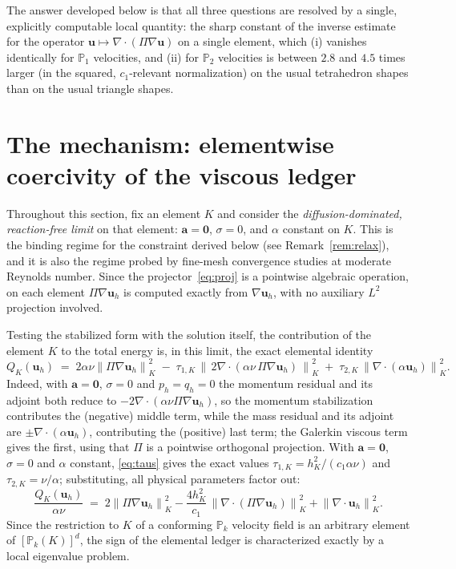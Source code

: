 \documentclass[11pt,a4paper]{article}
\theoremstyle{remark}
\newcommand{\PP}{\mathbb{P}}
\newcommand{\nK}[1]{\left\lVert #1 \right\rVert_{K}}
\newcommand{\Proj}{\Pi}
\begin{document}
The answer developed below is that all three questions are resolved by
a single, explicitly computable local quantity: the sharp constant of
the inverse estimate for the operator
$\boldsymbol u \mapsto \nabla\!\cdot(\Proj\nabla\boldsymbol u)$
on a single element, which (i) vanishes identically for $\PP_1$
velocities, and (ii) for $\PP_2$ velocities is between $2.8$ and $4.5$
times larger (in the squared, $c_1$-relevant normalization) on the
usual tetrahedron shapes than on the usual triangle shapes.

\section{The mechanism: elementwise coercivity of the viscous ledger}
\label{sec:mechanism}

Throughout this section, fix an element $K$ and consider the
\emph{diffusion-dominated, reaction-free limit} on that element:
$\boldsymbol a = \boldsymbol 0$, $\sigma = 0$, and $\alpha$ constant on
$K$. This is the binding regime for the constraint derived below (see
Remark~\ref{rem:relax}), and it is also the regime probed by
fine-mesh convergence studies at moderate Reynolds number. Since the
projector~\eqref{eq:proj} is a pointwise algebraic operation, on each
element $\Proj\nabla\boldsymbol u_h$ is computed exactly from
$\nabla\boldsymbol u_h$, with no auxiliary $L^2$ projection involved.

Testing the stabilized form with the solution itself, the contribution
of the element $K$ to the total energy is, in this limit, the exact
elemental identity
%
\begin{equation}
\label{eq:ledger}
Q_K(\boldsymbol u_h)
 \;=\;
 2\alpha\nu \nK{\Proj\nabla\boldsymbol u_h}^2
 \;-\; \tau_{1,K}\,\nK{\,2\nabla\!\cdot\!(\alpha\nu\,\Proj\nabla
        \boldsymbol u_h)\,}^2
 \;+\; \tau_{2,K}\,\nK{\nabla\!\cdot\!(\alpha\boldsymbol u_h)}^2 .
\end{equation}
%
Indeed, with $\boldsymbol a = \boldsymbol 0$, $\sigma = 0$ and $p_h =
q_h = 0$ the momentum residual and its adjoint both reduce to
$-2\nabla\!\cdot(\alpha\nu\Proj\nabla\boldsymbol u_h)$, so the
momentum stabilization contributes the (negative) middle term, while
the mass residual and its adjoint are $\pm\nabla\!\cdot(\alpha
\boldsymbol u_h)$, contributing the (positive) last term; the Galerkin
viscous term gives the first, using that $\Proj$ is a pointwise
orthogonal projection. With $\boldsymbol a = \boldsymbol 0$, $\sigma =
0$ and $\alpha$ constant, \eqref{eq:taus} gives the exact values
$\tau_{1,K} = h_K^2/(c_1\alpha\nu)$ and $\tau_{2,K} = \nu/\alpha$;
substituting, all physical parameters factor out:
%
\begin{equation}
\label{eq:ledger2}
\frac{Q_K(\boldsymbol u_h)}{\alpha\nu}
 \;=\;
 2 \nK{\Proj\nabla\boldsymbol u_h}^2
 - \frac{4 h_K^2}{c_1}\,
   \nK{\nabla\!\cdot\!(\Proj\nabla\boldsymbol u_h)}^2
 + \nK{\nabla\!\cdot\!\boldsymbol u_h}^2 .
\end{equation}
%
Since the restriction to $K$ of a conforming $\PP_k$ velocity field is
an arbitrary element of $[\PP_k(K)]^d$, the sign of the elemental
ledger is characterized exactly by a local eigenvalue problem.
\end{document}
